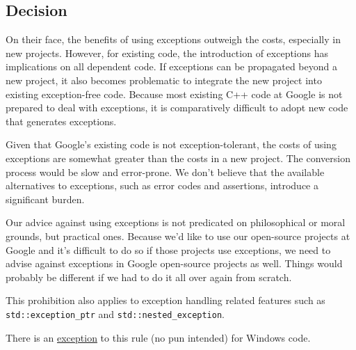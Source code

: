 \subsection{Decision}
On their face, the benefits of using exceptions outweigh the costs, especially in new projects. However, for existing code, the introduction of exceptions has implications on all dependent code. If exceptions can be propagated beyond a new project, it also becomes problematic to integrate the new project into existing exception-free code. Because most existing C++ code at Google is not prepared to deal with exceptions, it is comparatively difficult to adopt new code that generates exceptions.

Given that Google's existing code is not exception-tolerant, the costs of using exceptions are somewhat greater than the costs in a new project. The conversion process would be slow and error-prone. We don't believe that the available alternatives to exceptions, such as error codes and assertions, introduce a significant burden.

Our advice against using exceptions is not predicated on philosophical or moral grounds, but practical ones. Because we'd like to use our open-source projects at Google and it's difficult to do so if those projects use exceptions, we need to advise against exceptions in Google open-source projects as well. Things would probably be different if we had to do it all over again from scratch.

This prohibition also applies to exception handling related features such as \texttt{std::exception_ptr} and \texttt{std::nested_exception}.

There is an \hyperref[sec:windows-code]{exception} to this rule (no pun intended) for Windows code.

